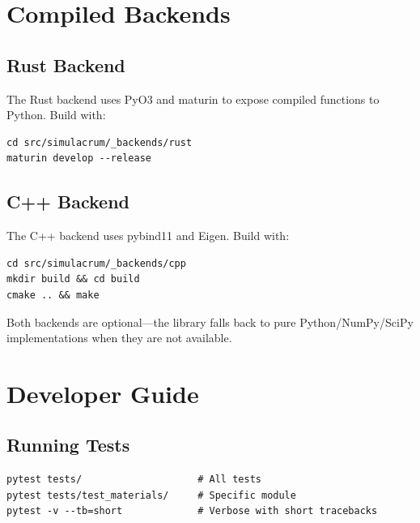 \documentclass[11pt,a4paper]{report}
\begin{document}
\chapter{Compiled Backends}

\section{Rust Backend}

The Rust backend uses PyO3 and maturin to expose compiled functions to Python. Build with:

\begin{lstlisting}[style=bash]
cd src/simulacrum/_backends/rust
maturin develop --release
\end{lstlisting}

\section{C++ Backend}

The C++ backend uses pybind11 and Eigen. Build with:

\begin{lstlisting}[style=bash]
cd src/simulacrum/_backends/cpp
mkdir build && cd build
cmake .. && make
\end{lstlisting}

Both backends are optional---the library falls back to pure Python/NumPy/SciPy implementations when they are not available.

\chapter{Developer Guide}

\section{Running Tests}

\begin{lstlisting}[style=bash]
pytest tests/                    # All tests
pytest tests/test_materials/     # Specific module
pytest -v --tb=short             # Verbose with short tracebacks
\end{lstlisting}
\end{document}
